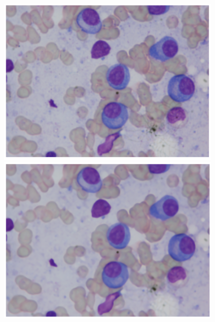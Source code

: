 \documentclass{article}
\begin{document}
\begin{figure}
  \centering
  \begin{minipage}{.5\textwidth}
    \centering
    \includegraphics[width=.5\linewidth]{8.png}
  \end{minipage}%
  \begin{minipage}{.4\textwidth}
    \centering
    \includegraphics[width=.63\linewidth]{9.png}
  \end{minipage}
\end{figure}
\end{document}
